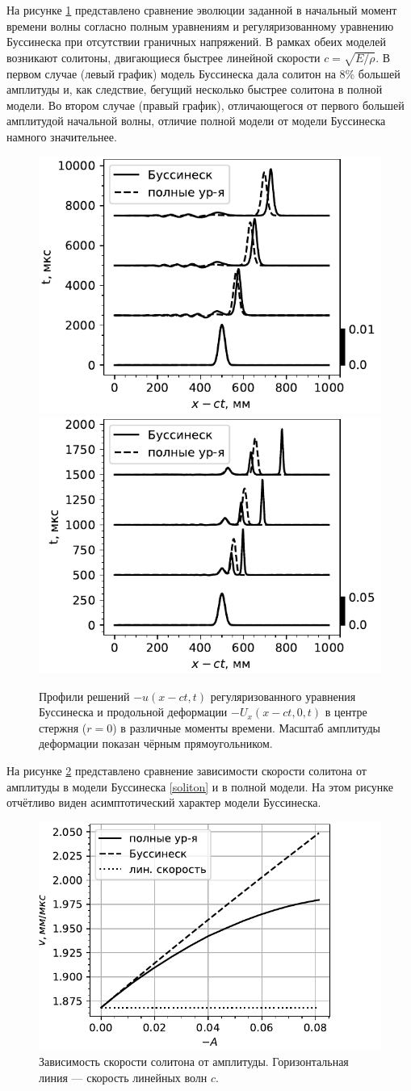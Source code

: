 \documentclass[12pt, a4paper]{article}
\begin{document}
На рисунке \ref{fig:evol_compare} представлено сравнение эволюции заданной в начальный момент времени волны согласно полным уравнениям и регуляризованному уравнению Буссинеска при отсутствии граничных напряжений. В рамках обеих моделей возникают солитоны, двигающиеся быстрее линейной скорости $c=\sqrt{E/\rho}$. В первом случае (левый график) модель Буссинеска дала солитон на 8\% большей амплитуды и, как следствие, бегущий несколько быстрее солитона в полной модели. Во втором случае (правый график), отличающегося от первого большей амплитудой начальной волны, отличие полной модели от модели Буссинеска намного значительнее. 
\begin{figure}[h!]
	\centering
	\includegraphics[width=0.44\linewidth]{Figures/SolEvolCompareSmall}
	\includegraphics[width=0.44\linewidth]{Figures/SolEvolCompareSmall2}
	\caption{Профили решений $-u(x-ct, t)$ регуляризованного уравнения Буссинеска и продольной деформации $-U_x(x - ct, 0, t)$ в центре стержня ($r=0$) в различные моменты времени. Масштаб амплитуды деформации показан чёрным прямоугольником.}
	\label{fig:evol_compare}
	\vspace{-2mm}
\end{figure}

На рисунке \ref{fig:sol_compare} представлено сравнение зависимости скорости солитона от амплитуды в модели Буссинеска \eqref{soliton} и в полной модели. На этом рисунке отчётливо виден асимптотический характер модели Буссинеска.
\begin{figure}[h!]
	\centering
	\includegraphics[width=0.53\linewidth]{Figures/VelAmplSmall}
	\vspace{-2mm}
	\caption{Зависимость скорости солитона от амплитуды. Горизонтальная линия --- скорость линейных волн $c$.}
	\label{fig:sol_compare}
	\vspace{-3mm}
\end{figure}
\end{document}
